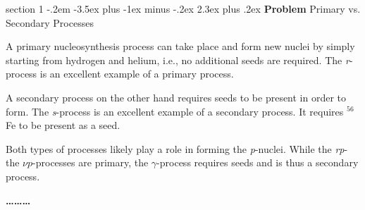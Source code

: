 \documentclass[letterpaper,12pt,twoside=false,DIV=11]{scrartcl}
\makeatletter
\newenvironment{problem}{\@startsection
    {section}
    {1}
    {-.2em}
    {-3.5ex plus -1ex minus -.2ex}
    {2.3ex plus .2ex}
    {
        \pagebreak[3] %
        \noindent\sffamily\bfseries Problem
    }
}
{
    \begin{center}\large\bfseries\ldots\ldots\ldots\end{center}
}
\providecommand{\ex}[1]{\ensuremath{^{#1}}}
\makeatother
\begin{document}
\begin{problem}{Primary vs. Secondary Processes}

A primary nucleosynthesis process can take place and form new nuclei by simply starting from hydrogen and helium, i.e., no additional seeds are required. The \textit{r}-process is an excellent example of a primary process. 

A secondary process on the other hand requires seeds to be present in order to form. The \textit{s}-process is an excellent example of a secondary process. It requires \ex{56}Fe to be present as a seed.

Both types of processes likely play a role in forming the \textit{p}-nuclei. While the \textit{rp}- the $\nu p$-processes are primary, the $\gamma$-process requires seeds and is thus a secondary process.
\end{problem}
\end{document}
